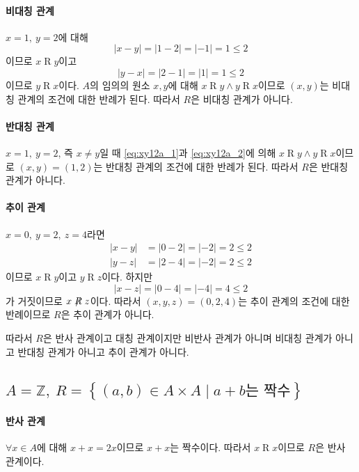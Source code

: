 \documentclass{oblivoir}
\begin{document}
\paragraph{비대칭 관계}
$x = 1,\ y = 2$에 대해
\begin{equation}\label{eq:xy12a_1}
    |x - y| = |1 - 2| = |-1| = 1 \leq 2
\end{equation}
이므로 $x \mathrel R y$이고
\begin{equation}\label{eq:xy12a_2}
    |y - x| = |2 - 1| = |1| = 1 \leq 2
\end{equation}
이므로 $y \mathrel R x$이다.
$A$의 임의의 원소 $x,y$에 대해 $x \mathrel R y \wedge y \mathrel R x$이므로
$(x,y)$는 비대칭 관계의 조건에 대한 반례가 된다.
따라서 $R$은 비대칭 관계가 아니다.

\paragraph{반대칭 관계}
$x = 1,\ y = 2$, 즉 $x \neq y$일 때
\eqref{eq:xy12a_1}과 \eqref{eq:xy12a_2}에 의해
$x \mathrel R y \wedge y \mathrel R x$이므로
$(x,y) = (1,2)$는 반대칭 관계의 조건에 대한 반례가 된다.
따라서 $R$은 반대칭 관계가 아니다.

\paragraph{추이 관계}
$x = 0,\ y = 2,\ z = 4$라면
\begin{align}
    |x - y| &= |0 - 2| = |-2| = 2 \leq 2 \\
    |y - z| &= |2 - 4| = |-2| = 2 \leq 2
\end{align}
이므로 $x \mathrel R y$이고 $y \mathrel R z$이다.
하지만
\begin{equation}
    |x - z| = |0 - 4| = |-4| = 4 \leq 2
\end{equation}가 거짓이므로
$x \not \mathrel R z$이다.
따라서 $(x,y,z) = (0,2,4)$는 추이 관계의 조건에 대한 반례이므로
$R$은 추이 관계가 아니다.

따라서 $R$은 반사 관계이고 대칭 관계이지만
비반사 관계가 아니며 비대칭 관계가 아니고 반대칭 관계가 아니고
추이 관계가 아니다.

\subsection{$A = \mathbb Z,\ R = \left\{ (a,b) \in A \times A \mid a + b\textrm{는 짝수} \right\}$}

\paragraph{반사 관계}
$\forall x \in A$에 대해 $x + x = 2x$이므로 $x + x$는 짝수이다.
따라서 $x \mathrel R x$이므로 $R$은 반사 관계이다.
\end{document}
